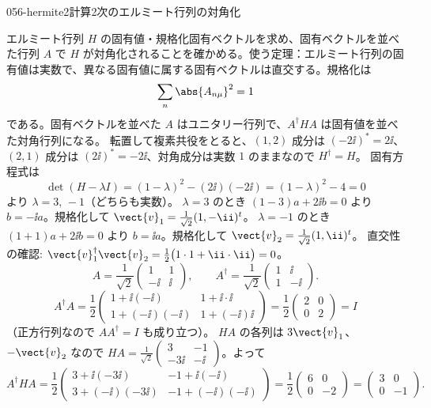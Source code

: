\documentclass[uplatex,dvipdfmx,a4paper,11pt]{jsarticle}
\begin{document}
\begin{mondai}{056-hermite2}{計算}{2次のエルミート行列の対角化}
\begin{tadashii}
\houshin エルミート行列 $H$ の固有値・規格化固有ベクトルを求め、固有ベクトルを並べた行列 $A$ で $H$ が対角化されることを確かめる。使う定理：エルミート行列の固有値は実数で、異なる固有値に属する固有ベクトルは直交する。規格化は
\[
\sum_n\abs{A_{n\mu}}^{2}=1
\]
である。固有ベクトルを並べた $A$ はユニタリー行列で、$A^{\dagger}HA$ は固有値を並べた対角行列になる。
\keisan
{} 転置して複素共役をとると、$(1,2)$ 成分は $(-2\ii)^{*}=2\ii$、$(2,1)$ 成分は $(2\ii)^{*}=-2\ii$、対角成分は実数 $1$ のままなので $H^{\dagger}=H$。
 固有方程式は
\[
\det(H-\lambda I)=(1-\lambda)^{2}-(2\ii)(-2\ii)=(1-\lambda)^{2}-4=0
\]
より $\lambda=3,\,-1$（どちらも実数）。
$\lambda=3$ のとき $(1-3)a+2\ii b=0$ より $b=-\ii a$。規格化して $\vect{v}_1=\frac{1}{\sqrt{2}}(1,-\ii)^{t}$。
$\lambda=-1$ のとき $(1+1)a+2\ii b=0$ より $b=\ii a$。規格化して $\vect{v}_2=\frac{1}{\sqrt{2}}(1,\ii)^{t}$。
直交性の確認: $\vect{v}_1^{\dagger}\vect{v}_2=\frac{1}{2}\bigl(1\cdot1+\ii\cdot\ii\bigr)=0$。
\[
A=\frac{1}{\sqrt{2}}\begin{pmatrix}1&1\\-\ii&\ii\end{pmatrix},\qquad A^{\dagger}=\frac{1}{\sqrt{2}}\begin{pmatrix}1&\ii\\1&-\ii\end{pmatrix}.
\]
\[
A^{\dagger}A=\frac{1}{2}\begin{pmatrix}1+\ii(-\ii)&1+\ii\cdot\ii\\1+(-\ii)(-\ii)&1+(-\ii)\ii\end{pmatrix}=\frac{1}{2}\begin{pmatrix}2&0\\0&2\end{pmatrix}=I
\]
（正方行列なので $AA^{\dagger}=I$ も成り立つ）。
$HA$ の各列は $3\vect{v}_1$、$-\vect{v}_2$ なので $HA=\frac{1}{\sqrt{2}}\begin{pmatrix}3&-1\\-3\ii&-\ii\end{pmatrix}$。よって
\[
A^{\dagger}HA=\frac{1}{2}\begin{pmatrix}3+\ii(-3\ii)&-1+\ii(-\ii)\\3+(-\ii)(-3\ii)&-1+(-\ii)(-\ii)\end{pmatrix}=\frac{1}{2}\begin{pmatrix}6&0\\0&-2\end{pmatrix}=\begin{pmatrix}3&0\\0&-1\end{pmatrix}.
\]
\end{tadashii}
\end{mondai}
\end{document}
